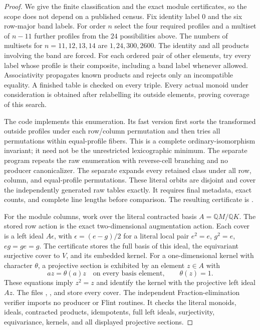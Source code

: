 \begin{proof}
We give the finite classification and the exact module
certificates, so the scope does not depend on a published census.
Fix identity label $0$ and the six row-major band labels.
For order $n$ select the four required profiles and a multiset
of $n-11$ further profiles from the $24$ possibilities above.
The numbers of multisets for $n=11,12,13,14$ are
$1,24,300,2600$.
The identity and all products involving the band are forced.
For each ordered pair of other elements, try every label whose
profile is their composite, including a band label whenever
allowed.  Associativity propagates known products and rejects
only an incompatible equality.  A finished table is checked
on every triple.  Every actual monoid under consideration is
obtained after relabelling its outside elements, proving
coverage of this search.

The code  implements this
enumeration.  Its fast version first sorts the transformed
outside profiles under each row/column permutation and then
tries all permutations within equal-profile fibers.  This is
a complete ordinary-isomorphism invariant; it need not be the
unrestricted lexicographic minimum.
The separate program  repeats
the raw enumeration with reverse-cell branching and no producer
canonicalizer.  The separate
 expands every retained
class under all row, column, and equal-profile permutations.
These literal orbits are disjoint and cover the independently
generated raw tables exactly.  It requires final metadata,
exact counts, and complete line lengths before comparison.
The resulting certificate is
.

For the module columns, work over the literal contracted basis
$A=\mathbb QM/\mathbb QK$.  The stored row action is the exact
two-dimensional augmentation action.  Each cover is a left
ideal $A\epsilon$, with
$\epsilon=(e-g)/2$ for a literal local pair
$e^2=e$, $g^2=e$, $eg=ge=g$.
The certificate stores the full basis of this ideal, the
equivariant surjective cover to $V$, and its embedded kernel.
For a one-dimensional kernel with character $\theta$, a
projective section is exhibited by an element $z\in A$ with
\[
 az=\theta(a)z\quad\text{on every basis element},\qquad
 \theta(z)=1.
\]
These equations imply $z^2=z$ and identify the kernel with
the projective left ideal $Az$.
The files ,
, and
 store every cover.
The independent Fraction-elimination verifier
 imports no producer
or Flint routines.  It checks the literal monoids, ideals,
contracted products, idempotents, full left ideals, surjectivity,
equivariance, kernels, and all displayed projective sections.


\end{proof}
